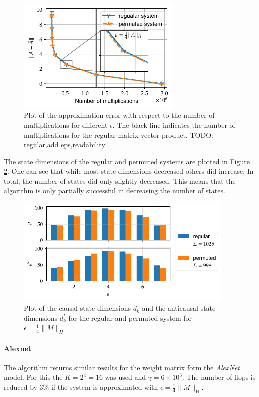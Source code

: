 \documentclass[doctype=mastersthesis,BCOR=15mm,biblatex]{ldvbook}%
\begin{document}
\begin{figure}[!htb]
	\centering
	\includegraphics[width=0.7\textwidth]{Plots/perm_example_mobilenet_error.pdf}
	\caption{Plot of the approximation error with respect to the number of multiplications for different $\epsilon$. 
		The black line indicates the number of multiplications for the regular matrix vector product. 
		TODO: regular,add eps,readability
	}
	\label{fig:mobilenet_err_cost_perm}
\end{figure}

The state dimensions of the regular and permuted systems are plotted in Figure\,\ref{fig:mobilenet_state_dims_perm}.
One can see that while most state dimensions decreased others did increase.
In total, the number of states did only slightly decreased.
This means that the algorithm is only partially successful in decreasing the number of states.
\begin{figure}[!htb]
	\centering
	\includegraphics[width=0.93\textwidth]{Plots/perm_example_mobilenet_state_dims.pdf}
	\caption{Plot of the causal state dimensions $d_k$ and the anticausal state dimensions $d_k^*$ for the regular and permuted system for $\epsilon = \frac{1}{4} \|M\|_H$
	}
	\label{fig:mobilenet_state_dims_perm}
\end{figure}

\paragraph{Alexnet}
The algorithm returns similar results for the weight matrix form the \emph{AlexNet} model.
For this the $K = 2^4 = 16$ was used and $\gamma =  6\times10^3$.
The number of flops is reduced by $3\%$ if the system is approximated with $\epsilon = \frac{1}{4}\|M\|_\text{H}$.
\end{document}
